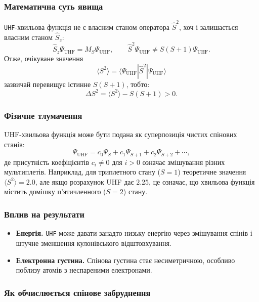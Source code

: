 \subsubsection*{Математична суть явища}

\texttt{UHF}-хвильова функція не є власним станом оператора $\hat{S}^2$, хоч і залишається власним станом $\hat{S}_z$:
\[
\hat{S}_z \Psi_{\text{UHF}} = M_S \Psi_{\text{UHF}}, \qquad
\hat{S}^2 \Psi_{\text{UHF}} \neq S(S+1)\Psi_{\text{UHF}}.
\]
Отже, очікуване значення
\[
\langle S^2 \rangle = \langle \Psi_{\text{UHF}} | \hat{S}^2 | \Psi_{\text{UHF}} \rangle
\]
зазвичай перевищує істинне $S(S+1)$, тобто:
\[
\Delta S^2 = \langle S^2 \rangle - S(S+1) > 0.
\]

\subsubsection*{Фізичне тлумачення}

UHF-хвильова функція може бути подана як суперпозиція чистих спінових станів:
\[
\Psi_{\text{UHF}} = c_0 \Psi_{S} + c_1 \Psi_{S+1} + c_2 \Psi_{S+2} + \cdots,
\]
де присутність коефіцієнтів $c_i \ne 0$ для $i>0$ означає змішування різних мультиплетів.
Наприклад, для триплетного стану ($S=1$) теоретичне значення $\langle S^2 \rangle = 2.0$, але якщо розрахунок UHF дає $2.25$, це означає, що хвильова функція містить домішку п’ятичленного ($S=2$) стану.

\subsubsection*{Вплив на результати}

\begin{itemize}
    \item \textbf{Енергія.} \texttt{UHF} може давати занадто низьку енергію через змішування спінів і штучне зменшення кулонівського відштовхування.
    \item \textbf{Електронна густина.} Спінова густина стає несиметричною, особливо поблизу атомів з неспареними електронами.
\end{itemize}

\subsubsection{Як обчислюється спінове забруднення}

